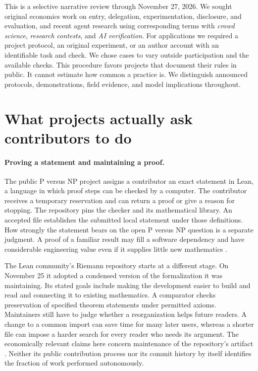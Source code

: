 \documentclass[11pt,letterpaper]{article}
\begin{document}
This is a selective narrative review through November 27, 2026. We sought original economics work on entry, delegation, experimentation, disclosure, and evaluation, and recent agent research using corresponding terms with \emph{crowd science}, \emph{research contests}, and \emph{AI verification}. For applications we required a project protocol, an original experiment, or an author account with an identifiable task and check. We chose cases to vary outside participation and the available checks. This procedure favors projects that document their rules in public. It cannot estimate how common a practice is. We distinguish announced protocols, demonstrations, field evidence, and model implications throughout.

\section{What projects actually ask contributors to do}

\paragraph{Proving a statement and maintaining a proof.}
The public P versus NP project assigns a contributor an exact statement in Lean, a language in which proof steps can be checked by a computer. The contributor receives a temporary reservation and can return a proof or give a reason for stopping. The repository pins the checker and its mathematical library. An accepted file establishes the submitted local statement under those definitions. How strongly the statement bears on the open P versus NP question is a separate judgment. A proof of a familiar result may fill a software dependency and have considerable engineering value even if it supplies little new mathematics \citep{pnp}.

The Lean community's Riemann repository starts at a different stage. On November 25 it adopted a condensed version of the formalization it was maintaining. Its stated goals include making the development easier to build and read and connecting it to existing mathematics. A comparator checks preservation of specified theorem statements under permitted axioms. Maintainers still have to judge whether a reorganization helps future readers. A change to a common import can save time for many later users, whereas a shorter file can impose a harder search for every reader who needs its argument. The economically relevant claims here concern maintenance of the repository's artifact \citep{rh}. Neither its public contribution process nor its commit history by itself identifies the fraction of work performed autonomously.
\end{document}
